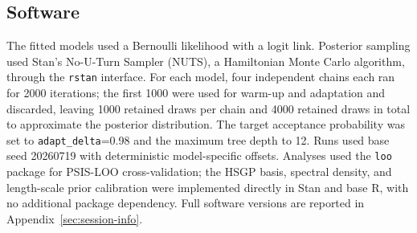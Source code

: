 \subsection{Software}
\label{sec:software}
The fitted models used a Bernoulli likelihood with a logit link. Posterior sampling used Stan's No-U-Turn Sampler (NUTS), a Hamiltonian Monte Carlo algorithm, through the \texttt{rstan} interface. For each model, four independent chains each ran for 2000 iterations; the first 1000 were used for warm-up and adaptation and discarded, leaving 1000 retained draws per chain and 4000 retained draws in total to approximate the posterior distribution. The target acceptance probability was set to \texttt{adapt\_delta}=0.98 and the maximum tree depth to 12. Runs used base seed 20260719 with deterministic model-specific offsets. Analyses used the \texttt{loo} package for PSIS-LOO cross-validation; the HSGP basis, spectral density, and length-scale prior calibration were implemented directly in Stan and base R, with no additional package dependency. Full software versions are reported in Appendix~\ref{sec:session-info}.
